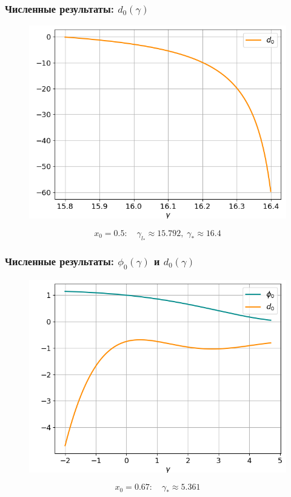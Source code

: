\documentclass[fullscreen=true, unicode, bookmarks=false]{beamer}
\begin{document}
\begin{frame}
\frametitle{ Численные результаты: $ d_0(\gamma) $ }

\begin{figure} 
\includegraphics[scale=0.55]{divergent_d0_12_3.png}  
\end{figure}

$$ x_0 = 0.5: \quad \gamma_{l_*} \approx 15.792, \; \gamma_* \approx 16.4 $$

\end{frame}

\begin{frame}
\frametitle{ Численные результаты: $ \phi_0(\gamma) $ и $ d_0(\gamma) $ }

\begin{figure} 
\includegraphics[scale=0.55]{divergent_phi0d0_23.png}  
\end{figure}

$$ x_0 = 0.67: \quad \gamma_* \approx 5.361 $$

\end{frame}
\end{document}
